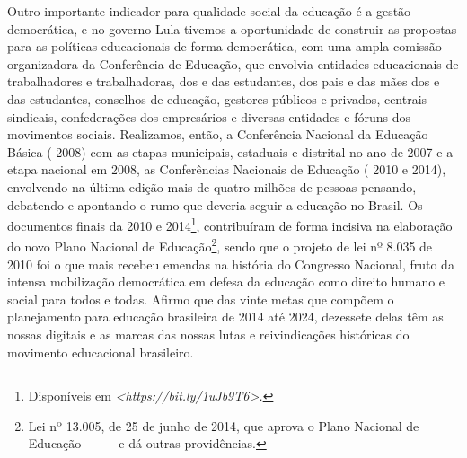 Outro importante indicador para qualidade social da educação é a gestão
democrática, e no governo Lula tivemos a oportunidade de construir as
propostas para as políticas educacionais de forma democrática, com uma
ampla comissão organizadora da Conferência de Educação, que envolvia
entidades educacionais de trabalhadores e trabalhadoras, dos e das
estudantes, dos pais e das mães dos e das estudantes, conselhos de
educação, gestores públicos e privados, centrais sindicais,
confederações dos empresários e diversas entidades e fóruns dos
movimentos sociais. Realizamos, então, a Conferência Nacional da
Educação Básica ( 2008) com as etapas municipais, estaduais e
distrital no ano de 2007 e a etapa nacional em 2008, as Conferências
Nacionais de Educação ( 2010 e 2014), envolvendo na última edição
mais de quatro milhões de pessoas pensando, debatendo e apontando o rumo
que deveria seguir a educação no Brasil. Os documentos finais da 
2010 e 2014\footnote{Disponíveis em \emph{\textless{}https://bit.ly/1uJb9T6\textgreater{}.}},
contribuíram de forma incisiva na elaboração do novo Plano Nacional de
Educação\footnote{Lei nº 13.005, de 25 de junho de 2014, que aprova
  o Plano Nacional de Educação ---  --- e dá outras providências.}, sendo que o
projeto de lei nº 8.035 de 2010 foi o que mais recebeu emendas
na história do Congresso Nacional, fruto da intensa mobilização
democrática em defesa da educação como direito humano e social para
todos e todas. Afirmo que das vinte metas que compõem o planejamento
para educação brasileira de 2014 até 2024, dezessete delas têm as nossas
digitais e as marcas das nossas lutas e reivindicações históricas do
movimento educacional brasileiro.

